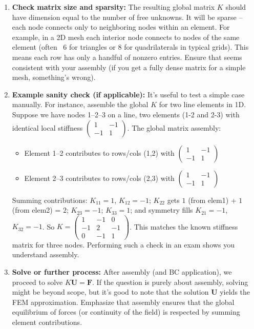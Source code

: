 \documentclass[a4paper,11pt]{article}
\begin{document}
\begin{enumerate}
    \item \textbf{Check matrix size and sparsity:} The resulting global matrix $K$ should have dimension equal to the number of free unknowns. It will be sparse -- each node connects only to neighboring nodes within an element. For example, in a 2D mesh each interior node connects to nodes of the same element (often ~6 for triangles or 8 for quadrilaterals in typical grids). This means each row has only a handful of nonzero entries. Ensure that seems consistent with your assembly (if you get a fully dense matrix for a simple mesh, something's wrong).

    \item \textbf{Example sanity check (if applicable):} It's useful to test a simple case manually. For instance, assemble the global $K$ for two line elements in 1D. Suppose we have nodes 1--2--3 on a line, two elements (1-2 and 2-3) with identical local stiffness $\begin{pmatrix}1&-1\\-1&1\end{pmatrix}$. The global matrix assembly:
          \begin{itemize}
              \item Element 1--2 contributes to rows/cols (1,2) with $\begin{pmatrix}1&-1\\-1&1\end{pmatrix}$
              \item Element 2--3 contributes to rows/cols (2,3) with $\begin{pmatrix}1&-1\\-1&1\end{pmatrix}$
          \end{itemize}
          Summing contributions: $K_{11}=1$, $K_{12}=-1$; $K_{22}$ gets $1$ (from elem1) + $1$ (from elem2) = $2$; $K_{23}=-1$; $K_{33}=1$; and symmetry fills $K_{21}=-1$, $K_{32}=-1$. So $K = \begin{pmatrix}1&-1&0\\-1&2&-1\\0&-1&1\end{pmatrix}$. This matches the known stiffness matrix for three nodes. Performing such a check in an exam shows you understand assembly.

    \item \textbf{Solve or further process:} After assembly (and BC application), we proceed to solve $K \mathbf{U} = \mathbf{F}$. If the question is purely about assembly, solving might be beyond scope, but it's good to note that the solution $\mathbf{U}$ yields the FEM approximation. Emphasize that assembly ensures that the global equilibrium of forces (or continuity of the field) is respected by summing element contributions.
\end{enumerate}
\end{document}
